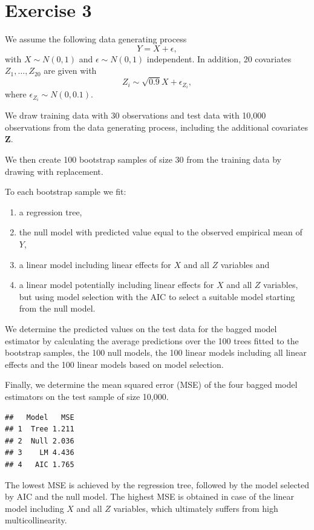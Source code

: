 \documentclass[
]{article}
\begin{document}
\section{Exercise 3}\label{exercise-3}

We assume the following data generating process \[ Y = X + \epsilon, \]
with \(X \sim N(0,1)\) and \(\epsilon \sim N(0,1)\) independent. In
addition, 20 covariates \(Z_1,\ldots,Z_{20}\) are given with
\[Z_i \sim \sqrt{0.9}X + \epsilon_{Z_i},\] where
\(\epsilon_{Z_i} \sim N(0, 0.1)\).

We draw training data with 30 observations and test data with 10,000
observations from the data generating process, including the additional
covariates \(\mathbf{Z}\).

We then create 100 bootstrap samples of size 30 from the training data
by drawing with replacement.

To each bootstrap sample we fit:

\begin{enumerate}
\item a regression tree,
\item the null model with predicted value equal to the observed empirical mean of $Y$,
\item a linear model including linear effects for $X$ and all $Z$ variables and
\item a linear model potentially including linear effects for $X$ and all $Z$ variables, but using model selection
with the AIC to select a suitable model starting from the null model.
\end{enumerate}

We determine the predicted values on the test data for the bagged model
estimator by calculating the average predictions over the 100 trees
fitted to the bootstrap samples, the 100 null models, the 100 linear
models including all linear effects and the 100 linear models based on
model selection.

Finally, we determine the mean squared error (MSE) of the four bagged
model estimators on the test sample of size 10,000.

\begin{verbatim}
##   Model   MSE
## 1  Tree 1.211
## 2  Null 2.036
## 3    LM 4.436
## 4   AIC 1.765
\end{verbatim}

The lowest MSE is achieved by the regression tree, followed by the model
selected by AIC and the null model. The highest MSE is obtained in case
of the linear model including \(X\) and all \(Z\) variables, which
ultimately suffers from high multicollinearity.
\end{document}
